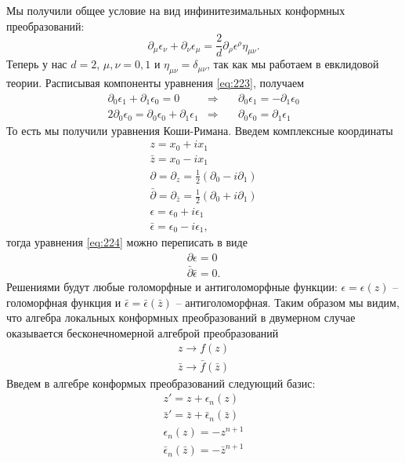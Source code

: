 \documentclass[a4paper,12pt]{article}
\theoremstyle{definition}
\theoremstyle{definition}
\theoremstyle{definition}
\begin{document}
Мы получили общее условие на вид инфинитезимальных конформных преобразований:
\begin{equation}
  \label{eq:223}
  \partial_{\mu}\epsilon_{\nu}+\partial_{\nu}\epsilon_{\mu}=\frac{2}{d} \partial_{\rho}\epsilon^{\rho} \eta_{\mu\nu}.
\end{equation}
Теперь у нас $d=2$, $\mu,\nu=0,1$ и $\eta_{\mu\nu}=\delta_{\mu\nu}$, так как мы работаем в евклидовой теории. Расписывая компоненты уравнения \eqref{eq:223}, получаем
\begin{eqnarray}
  \label{eq:224}
  \partial_{0} \epsilon_{1}+ \partial_{1}\epsilon_{0}=0& \Rightarrow & \quad\partial_{0} \epsilon_{1}=- \partial_{1}\epsilon_{0}\\
  2\partial_{0}\epsilon_{0}=\partial_{0}\epsilon_{0}+\partial_{1}\epsilon_{1}& \Rightarrow& \quad \partial_{0} \epsilon_{0}= \partial_{1}\epsilon_{1}
\end{eqnarray}
То есть мы получили уравнения Коши-Римана. Введем комплексные координаты
\begin{eqnarray}
  \label{eq:225}
  z=x_{0}+i x_{1}\\
  \bar z = x_{0}-i x_{1}\\
  \partial = \partial_{z}=\frac{1}{2}(\partial_{0}-i\partial_{1}) \\
  \bar \partial=\partial_{\bar z}=\frac{1}{2} (\partial_{0}+i \partial_{1})\\
  \epsilon=\epsilon_{0}+i \epsilon_{1}\\
  \bar \epsilon=\epsilon_{0}-i \epsilon_{1}, 
\end{eqnarray}
тогда уравнения \eqref{eq:224} можно переписать в виде
\begin{eqnarray}
  \label{eq:226}
  \partial \epsilon=0\\
  \bar \partial \bar \epsilon=0.
\end{eqnarray}
Решениями будут любые голоморфные и антиголоморфные функции: $\epsilon=\epsilon(z)$ -- голоморфная функция и $\bar \epsilon=\bar \epsilon(\bar z)$ -- антиголоморфная. Таким образом мы видим, что алгебра локальных конформных преобразований в двумерном случае оказывается бесконечномерной алгеброй преобразований
\begin{eqnarray}
  \label{eq:227}
  z\to f(z)\\
  \bar z \to \bar f(\bar z)
\end{eqnarray}
Введем в алгебре конформых преобразований следующий базис:
\begin{eqnarray}
  \label{eq:228}
  z'=z+\epsilon_{n}(z)\\
  \bar z'=\bar z+\bar \epsilon_{n}(\bar z)\\
  \epsilon_{n}(z)= -z^{n+1}\\
  \bar \epsilon_{n}(\bar z)=-\bar z^{n+1}
\end{eqnarray}
\end{document}
